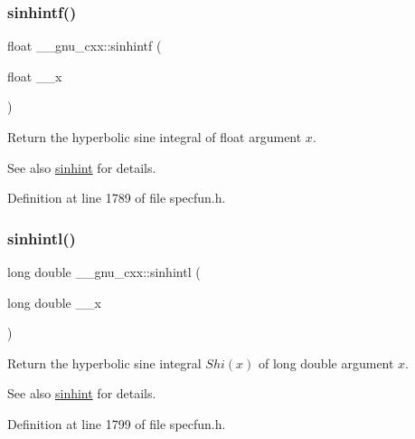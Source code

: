 \subsubsection{\texorpdfstring{sinhintf()}{sinhintf()}}
{\footnotesize\ttfamily float \+\_\+\+\_\+gnu\+\_\+cxx\+::sinhintf (\begin{DoxyParamCaption}\item[{float}]{\+\_\+\+\_\+x }\end{DoxyParamCaption})\hspace{0.3cm}{\ttfamily [inline]}}

Return the hyperbolic sine integral of {\ttfamily float} argument $ x $.

\begin{DoxySeeAlso}{See also}
\hyperlink{group__gnu__math__spec__func_gab5cbc831c5fab99a967c03d059f1ad59}{sinhint} for details. 
\end{DoxySeeAlso}


Definition at line 1789 of file specfun.\+h.

\mbox{\label{group__gnu__math__spec__func_ga8b7f1a070be7233a3179e3cbded387ee}} 
\subsubsection{\texorpdfstring{sinhintl()}{sinhintl()}}
{\footnotesize\ttfamily long double \+\_\+\+\_\+gnu\+\_\+cxx\+::sinhintl (\begin{DoxyParamCaption}\item[{long double}]{\+\_\+\+\_\+x }\end{DoxyParamCaption})\hspace{0.3cm}{\ttfamily [inline]}}

Return the hyperbolic sine integral $ Shi(x) $ of {\ttfamily long double} argument $ x $.

\begin{DoxySeeAlso}{See also}
\hyperlink{group__gnu__math__spec__func_gab5cbc831c5fab99a967c03d059f1ad59}{sinhint} for details. 
\end{DoxySeeAlso}


Definition at line 1799 of file specfun.\+h.

\mbox{\label{group__gnu__math__spec__func_ga076c8d52588904f5711c41781f8acfa0}} 
